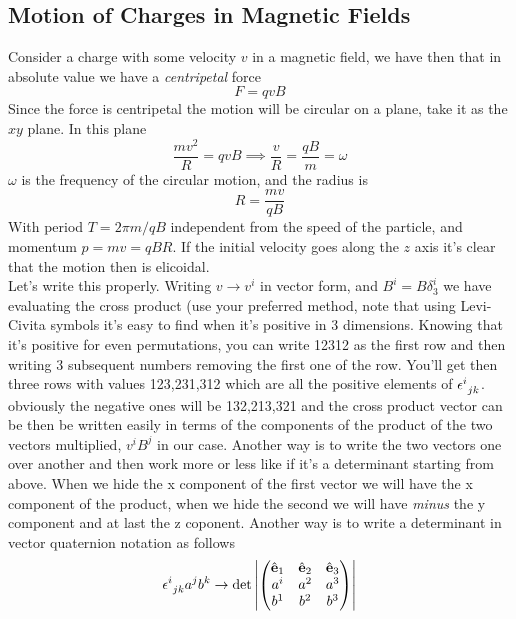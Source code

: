 \documentclass[../electromagnetism]{subfiles}
\begin{document}
\subsection{Motion of Charges in Magnetic Fields}
Consider a charge with some velocity $v$ in a magnetic field, we have then that in absolute value we have a \textit{centripetal} force
\begin{equation*}
	F=qvB
\end{equation*}
Since the force is centripetal the motion will be circular on a plane, take it as the $xy$ plane. In this plane
\begin{equation*}
	\frac{mv^2}{R}=qvB\implies\frac{v}{R}=\frac{qB}{m}=\omega
\end{equation*}
$\omega$ is the frequency of the circular motion, and the radius is
\begin{equation*}
	R=\frac{mv}{qB}
\end{equation*}
With period $T=2\pi m/qB$ independent from the speed of the particle, and momentum $p=mv=qBR$. If the initial velocity goes along the $z$ axis it's clear that the motion then is elicoidal.\\
Let's write this properly. Writing $v\to v^i$ in vector form, and $B^i=B\delta^i_3$ we have evaluating the cross product (use your preferred method, note that using Levi-Civita symbols it's easy to find when it's positive in 3 dimensions. Knowing that it's positive for even permutations, you can write 12312 as the first row and then writing 3 subsequent numbers removing the first one of the row. You'll get then three rows with values 123,231,312 which are all the positive elements of $\epsilon^{i}_{\ jk}$. obviously the negative ones will be 132,213,321 and the cross product vector can be then be written easily in terms of the components of the product of the two vectors multiplied, $v^iB^j$ in our case. Another way is to write the two vectors one over another and then work more or less like if it's a determinant starting from above. When we hide the x component of the first vector we will have the x component of the product, when we hide the second we will have \emph{minus} the y component and at last the z coponent. Another way is to write a determinant in vector quaternion notation as follows
	\begin{equation*}
		\epsilon^{i}_{\ jk}a^jb^k\to\det\abs{\begin{pmatrix}\hat{\mathbf{e}}_1&\hat{\mathbf{e}}_2&\hat{\mathbf{e}}_3\\a^i&a^2&a^3\\b^1&b^2&b^3\end{pmatrix}}
	\end{equation*}
\end{document}
